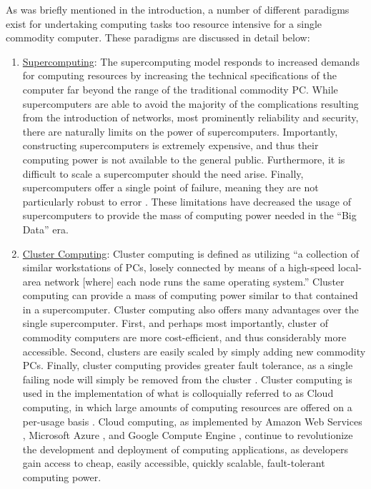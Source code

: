 As was briefly mentioned in the introduction, a number of different paradigms
exist for undertaking computing tasks too resource intensive for a single
commodity computer. These paradigms are discussed in detail below:

\begin{enumerate}
  \item \underline{Supercomputing}: The supercomputing model responds to
    increased demands for computing resources by increasing the technical
    specifications of the computer far beyond the range of the
    traditional commodity PC.
    While supercomputers are able to avoid the majority of the complications
    resulting from the introduction of networks, most prominently reliability and
    security, there are naturally limits on the power of supercomputers.
    Importantly, constructing supercomputers is extremely expensive, and thus
    their computing power is not available to the general public. Furthermore,
    it is difficult to scale a supercomputer should the need arise. Finally,
    supercomputers offer a single point of failure, meaning they are not
    particularly robust to
    error \cite{cluster-computing-the-commodity-supercomputer}.
    These limitations have decreased the usage of
    supercomputers to provide the mass of computing power needed in the ``Big
    Data'' era.

  \item \underline{Cluster Computing}: Cluster computing is defined as utilizing
    ``a collection of similar workstations of PCs, losely connected by means of
    a high-speed local-area network [where] each node runs the same operating
    system.''\cite[pg. 17-18]{distributed-systems-principles-and-paradigms}
    Cluster computing can provide a mass of computing power similar to
    that contained in a supercomputer. Cluster computing also offers many
    advantages over the single supercomputer. First, and perhaps most
    importantly, cluster of commodity computers are
    more cost-efficient, and thus considerably more
    accessible. Second, clusters are easily scaled
    by simply adding new commodity PCs.
    Finally, cluster computing provides greater fault
    tolerance, as a single failing node will simply be removed
    from the cluster \cite{cluster-based-scalable-network-services}.
    Cluster computing is used in the
    implementation of what is colloquially referred to as Cloud
    computing, in which large amounts of computing resources are offered on a
    per-usage basis \cite{distributed-systems-concepts-and-design}.
    Cloud computing, as implemented by Amazon Web
    Services \cite{amazon-web-services}, Microsoft Azure \cite{microsoft-azure},
    and Google Compute Engine \cite{google-compute-engine}, continue to
    revolutionize the development and deployment of computing applications, as
    developers gain access to cheap, easily accessible, quickly scalable,
    fault-tolerant computing power.


\end{enumerate}

